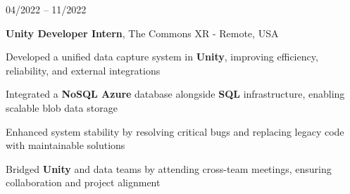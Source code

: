 \begin{twocolentry}{
    04/2022 – 11/2022
}

\fontsize{11 pt}{11 pt}\textbf{Unity Developer Intern}, The Commons XR - Remote, USA\end{twocolentry}

\vspace{0.10 cm}
\begin{onecolentry}
   \begin{highlights}
       \item Developed a unified data capture system in \textbf{Unity}, improving efficiency, reliability, and external integrations
       \item Integrated a \textbf{NoSQL Azure} database alongside \textbf{SQL} infrastructure, enabling scalable blob data storage
       \item Enhanced system stability by resolving critical bugs and replacing legacy code with maintainable solutions
       \item Bridged \textbf{Unity} and data teams by attending cross-team meetings, ensuring collaboration and project alignment
   \end{highlights}
\end{onecolentry}
